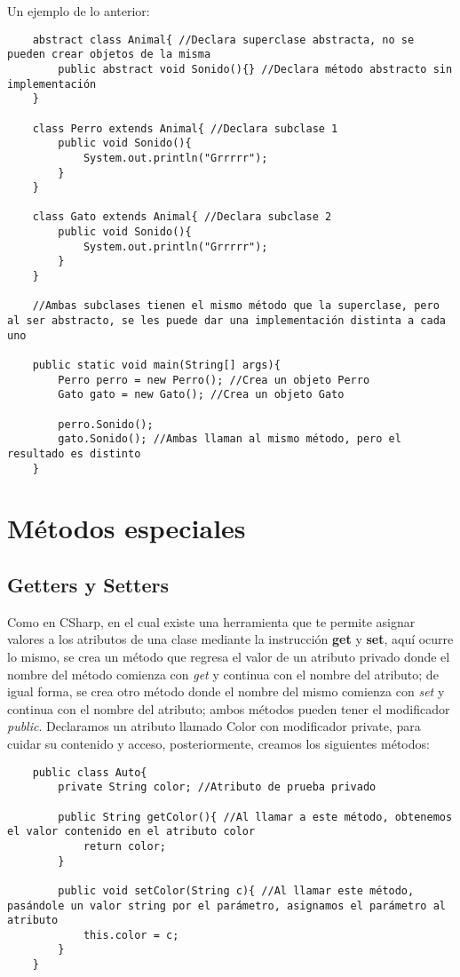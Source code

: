 Un ejemplo de lo anterior:
\begin{lstlisting}
    abstract class Animal{ //Declara superclase abstracta, no se pueden crear objetos de la misma
        public abstract void Sonido(){} //Declara método abstracto sin implementación
    }
    
    class Perro extends Animal{ //Declara subclase 1
        public void Sonido(){
            System.out.println("Grrrrr");
        }
    }
    
    class Gato extends Animal{ //Declara subclase 2
        public void Sonido(){
            System.out.println("Grrrrr");
        }
    }
    
    //Ambas subclases tienen el mismo método que la superclase, pero al ser abstracto, se les puede dar una implementación distinta a cada uno
    
    public static void main(String[] args){
        Perro perro = new Perro(); //Crea un objeto Perro
        Gato gato = new Gato(); //Crea un objeto Gato
        
        perro.Sonido();
        gato.Sonido(); //Ambas llaman al mismo método, pero el resultado es distinto
    }
\end{lstlisting}



\section{Métodos especiales}


\subsection{Getters y Setters}
\hspace{0.55cm}Como en CSharp, en el cual existe una herramienta que te permite asignar valores a los atributos de una clase mediante la instrucción \textbf{get} y \textbf{set}, aquí ocurre lo mismo, se crea un método que regresa el valor de un atributo privado donde el nombre del método comienza con \textit{get} y continua con el nombre del atributo; de igual forma, se crea otro método donde el nombre del mismo comienza con \textit{set} y continua con el nombre del atributo; ambos métodos pueden tener el modificador \textit{public}. Declaramos un atributo llamado Color con modificador private, para cuidar su contenido y acceso, posteriormente, creamos los siguientes métodos:
\begin{lstlisting}
    public class Auto{
        private String color; //Atributo de prueba privado
        
        public String getColor(){ //Al llamar a este método, obtenemos el valor contenido en el atributo color
            return color;
        }
        
        public void setColor(String c){ //Al llamar este método, pasándole un valor string por el parámetro, asignamos el parámetro al atributo
            this.color = c;
        }
    }
\end{lstlisting}

